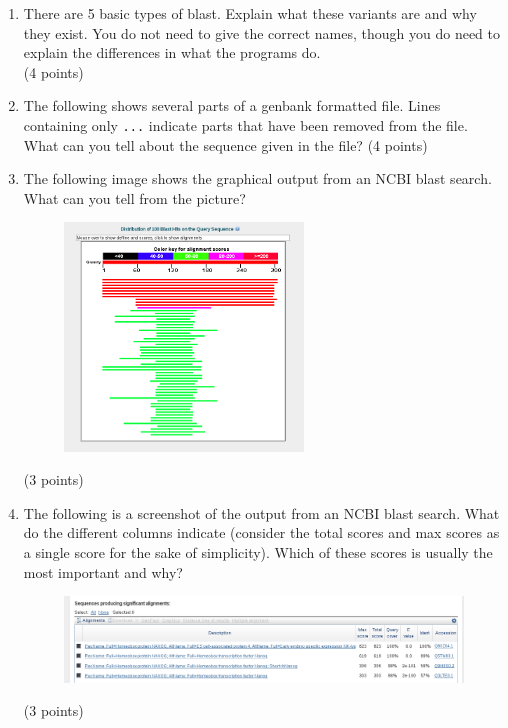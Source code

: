 \documentclass[11pt]{article}
\begin{document}
\begin{enumerate}
{  \texttt{S2}.
}\\
(5 points)
\item There are 5 basic types of blast. Explain what these variants are and
  why they exist. You do not need to give the correct names, though you do
  need to explain the differences in what the programs do.\\
  (4 points)
\item The following shows several parts of a genbank formatted file. Lines
  containing only \texttt{...} indicate parts that have been removed from the
  file. What can you tell about the sequence given in the file?
  {\tiny }
  (4 points)
\item The following image shows the graphical output from an NCBI blast
  search. What can you tell from the picture?
  \begin{figure}[H]
  \includegraphics[width=0.6\textwidth]{images/blast_result_image}
  \end{figure}
  (3 points)
\item The following is a screenshot of the output from an NCBI blast
  search. What do the different columns indicate (consider the total scores
  and max scores as a single score for the sake of simplicity). Which of these
  scores is usually the most important and why?
  \begin{figure}[H]
    \includegraphics[width=\textwidth]{images/blast_result_list_top}
  \end{figure}
  (3 points)
\end{enumerate}
\end{document}
